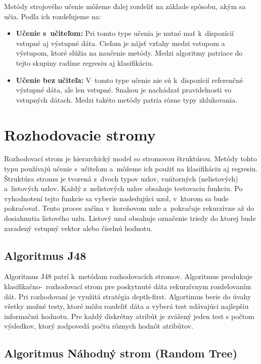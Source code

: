 \newpage
Metódy strojového učenie môžeme ďalej rozdeliť na základe spôsobu, akým sa učia. Podľa \cite{alpaydin} ich rozdeľujeme na:
\begin{itemize}
	\item \textbf{Učenie s~učiteľom:} Pri tomto type učenia je nutné mať k~dispozícií vstupné aj výstupné dáta. Cieľom je nájsť vzťahy medzi vstupom a výstupom, ktoré slúžia na naučenie metódy. Medzi algoritmy patriace do tejto skupiny radíme regresiu aj klasifikáciu.
	\item \textbf{Učenie bez učiteľa:} V~tomto type učenie nie sú k~dispozícií referenčné výstupné dáta, ale len vstupné. Snahou je nachádzať pravidelnosti vo vstupných dátach. Medzi takéto metódy patria rôzne typy zhlukovania. 
\end{itemize}

\section {Rozhodovacie stromy}
Rozhodovací strom je hierarchický model so stromovou štruktúrou. Metódy tohto typu používajú učenie s~učiteľom a~môžeme ich použiť na klasifikáciu aj regresiu. Štruktúra stromu je tvorená z~dvoch typov uzlov, vnútorných (nelistových) a~listových uzlov. Každý z~nelistových uzlov obsahuje testovaciu funkciu. Po vyhodnotení tejto funkcie sa vyberie nasledujúci uzol, v~ktorom sa bude pokračovať. Tento proces začína v~koreňovom uzle a~pokračuje rekurzívne až do dosiahnutia listového uzlu. Listový uzol obsahuje označenie triedy do ktorej bude zaradený vstupný vektor alebo číselnú hodnotu.

\subsection{Algoritmus J48}

Algoritmus J48 patrí k~metódam rozhodovacích stromov. Algoritmus produkuje klasifikačno-~rozhodovací strom pre poskytnuté dáta rekurzívnym rozdeľovaním dát. Pri rozhodovaní je využitá stratégia depth-first. Algortimus berie do úvahy všetky možné testy, ktoré môžu rozdeliť dáta a vyberá test udávajúci najlepšiu informačnú hodnotu. Pre každý diskrétny atribút je zvážený jeden test s počtom výsledkov, ktorý zodpovedá počtu rôznych hodnôt atribútov.  

\subsection{Algoritmus Náhodný strom (Random Tree)}

